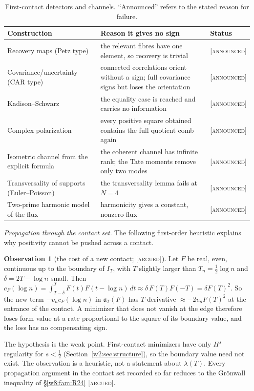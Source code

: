 \documentclass[11pt]{amsart}
\theoremstyle{definition}
\newtheorem{observation}[theorem]{Observation}
\theoremstyle{remark}
\numberwithin{equation}{section}
\newcommand{\IT}{I_T}                                  %
\newcommand{\cF}{c_F}                                  %
\newcommand{\aT}{\mathfrak{a}_T}                       %
\newcommand{\lam}{\lambda(T)}                          %
\newcommand{\stag}[1]{\textsc{[#1]}}
\newcommand{\ARGUED}{\stag{argued}}
\newcommand{\ANNOUNCED}{\stag{announced}}
\begin{document}
\begin{table}[htbp]\centering\small
\begin{tabular}{p{4.2cm}p{7.6cm}l}
\hline
Construction & Reason it gives no sign & Status\\\hline
Recovery maps (Petz type) & the relevant fibres have one element, so recovery is trivial & \ANNOUNCED\\
Covariance/uncertainty (CAR type) & connected correlations orient without a sign; full covariance signs but loses the orientation & \ANNOUNCED\\
Kadison--Schwarz & the equality case is reached and carries no information & \ANNOUNCED\\
Complex polarization & every positive square obtained contains the full quotient comb again & \ANNOUNCED\\
Isometric channel from the explicit formula & the coherent channel has infinite rank; the Tate moments remove only two modes & \ANNOUNCED\\
Transversality of supports (Euler--Poisson) & the transversality lemma fails at $N=4$ & \ANNOUNCED\\
Two-prime harmonic model of the flux & harmonicity gives a constant, nonzero flux & \ANNOUNCED\\\hline
\end{tabular}
\caption{First-contact detectors and channels. ``Announced'' refers to the stated reason for failure.}\label{w8:tab:contact}
\end{table}

\emph{Propagation through the contact set.} The following first-order heuristic explains why positivity cannot be
pushed across a contact.

\begin{observation}[the cost of a new contact; \ARGUED]\label{w8:obs:jump}
Let $F$ be real, even, continuous up to the boundary of $\IT$, with $T$ slightly larger than $T_n=\frac12\log n$ and
$\delta=2T-\log n$ small. Then $\cF(\log n)=\int_{T-\delta}^{T}F(t)F(t-\log n)\,dt\approx\delta\,F(T)F(-T)=\delta F(T)^2$.
So the new term $-v_n\cF(\log n)$ in $\aT(F)$ has $T$-derivative $\approx-2v_nF(T)^2$ at the entrance of the contact.
A minimizer that does not vanish at the edge therefore loses form value at a rate proportional to the square of its
boundary value, and the loss has no compensating sign.
\end{observation}

The hypothesis is the weak point. First-contact minimizers have only $H^s$ regularity for $s<\frac12$
(Section~\ref{w2:sec:structure}), so the boundary value need not exist. The observation is a heuristic, not a
statement about $\lam$. Every propagation argument in the contact set recorded so far reduces to the
Gr\"onwall inequality of \S\ref{w8:fam:R24} \ARGUED.
\end{document}

